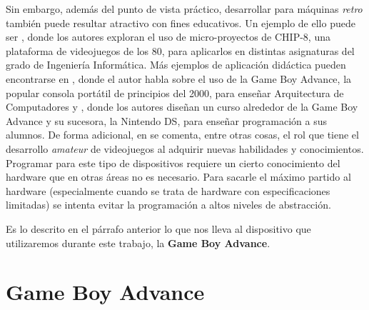 Sin embargo, además del punto de vista práctico, desarrollar para máquinas {\it retro} también puede resultar atractivo con fines educativos. Un ejemplo de ello puede ser \cite{bib:paper_1}, donde los autores exploran el uso de micro-proyectos de CHIP-8, una plataforma de videojuegos de los 80, para aplicarlos en distintas asignaturas del grado de Ingeniería Informática. Más ejemplos de aplicación didáctica pueden encontrarse en \cite{bib:paper_2}, donde el autor habla sobre el uso de la Game Boy Advance, la popular consola portátil de principios del 2000, para enseñar Arquitectura de Computadores y \cite{bib:paper3}, donde los autores diseñan un curso alrededor de la Game Boy Advance y su sucesora, la Nintendo DS, para enseñar programación a sus alumnos. De forma adicional, en \cite{bib:paper_5} se comenta, entre otras cosas, el rol que tiene el desarrollo \textit{amateur} de videojuegos al adquirir nuevas habilidades y conocimientos. Programar para este tipo de dispositivos requiere un cierto conocimiento del hardware que en otras áreas no es necesario. Para sacarle el máximo partido al hardware (especialmente cuando se trata de hardware con especificaciones limitadas) se intenta evitar la programación a altos niveles de abstracción.

Es lo descrito en el párrafo anterior lo que nos lleva al dispositivo que utilizaremos durante este trabajo, la {\bf Game Boy Advance}.

\section{Game Boy Advance}


